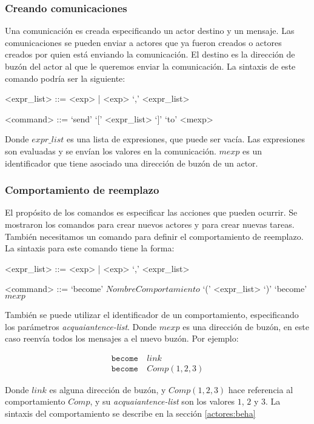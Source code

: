 \subsubsection*{Creando comunicaciones}
Una comunicación es creada especificando un actor destino y un mensaje. Las comunicaciones se pueden enviar a actores que ya fueron creados o actores creados por quien está enviando la comunicación. El destino es la dirección de buzón del actor al que le queremos enviar la comunicación. La sintaxis de este comando podría ser la siguiente:

\begin{grammar}
  <expr_list> ::= <exp> | <exp> `,' <expr_list>  

  <command> ::= `send' `[' <expr_list> `]' `to' <mexp>  
\end{grammar}

Donde $expr\_list$ es una lista de expresiones, que puede ser vacía. Las expresiones son evaluadas y se envían los valores en la comunicación. $mexp$ es un identificador que tiene asociado una dirección de buzón de un actor. 

\subsubsection*{Comportamiento de reemplazo}

El propósito de los comandos es especificar las acciones que pueden ocurrir. Se mostraron los comandos para crear nuevos actores y para crear nuevas tareas. También necesitamos un comando para definir el comportamiento de reemplazo. La sintaxis para este comando tiene la forma:

\begin{grammar}
  <expr_list> ::= <exp> | <exp> `,' <expr_list>  

  <command> ::= `become' $NombreComportamiento$ `(' <expr_list> `)'
  \alt `become' $mexp$
\end{grammar}

También se puede utilizar el identificador de un comportamiento, especificando los parámetros \textit{acquaiantence-list}. Donde $mexp$ es una dirección de buzón, en este caso reenvía todos los mensajes a el nuevo buzón.  Por ejemplo:

\begin{align*}
 \texttt{become}&\ link \\
 \texttt{become}&\ Comp(1,2,3) 
\end{align*}

Donde $link$ es alguna dirección de buzón, y $Comp(1,2,3)$ hace referencia al comportamiento $Comp$, y su \textit{acquaiantence-list} son los valores $1$, $2$ y $3$. La sintaxis del comportamiento se describe en la sección \ref{actores:beha}


